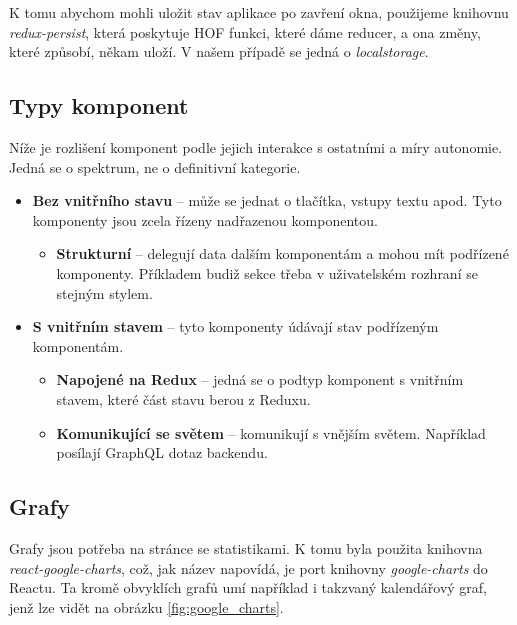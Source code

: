 K tomu abychom mohli uložit stav aplikace po zavření okna, použijeme knihovnu \textit{redux-persist}, která poskytuje
HOF funkci, které dáme reducer, a ona změny, které způsobí, někam uloží. \citep[viz][]{reduxpersist}
V našem případě se jedná o \textit{localstorage}.

\subsection{Typy komponent}

Níže je rozlišení komponent podle jejich interakce s ostatními a míry autonomie.
Jedná se o spektrum, ne o definitivní kategorie.

\begin{itemize}
  \setlength\itemsep{0.05em}
  \item \textbf{Bez vnitřního stavu} -- může se jednat o tlačítka, vstupy textu apod. Tyto komponenty jsou zcela řízeny
      nadřazenou komponentou.
  \begin{itemize}
    \setlength\itemsep{0.05em}
    \item \textbf{Strukturní} -- delegují data dalším komponentám a mohou mít podřízené komponenty. Příkladem budiž sekce třeba v 
        uživatelském rozhraní se stejným stylem.
  \end{itemize}
  \item \textbf{S vnitřním stavem} -- tyto komponenty údávají stav podřízeným komponentám.
  \begin{itemize}
    \setlength\itemsep{0.05em}
    \item \textbf{Napojené na Redux} -- jedná se o podtyp komponent s vnitřním stavem, které část stavu berou z Reduxu.
    \item \textbf{Komunikující se světem} --  komunikují s vnějším světem. Například posílají GraphQL dotaz backendu.
  \end{itemize}
\end{itemize}

\subsection{Grafy}

Grafy jsou potřeba na stránce se statistikami. K tomu byla použita knihovna \textit{react-google-charts},
což, jak název napovídá, je port knihovny \textit{google-charts} do Reactu. Ta kromě obvyklích grafů umí
například i takzvaný kalendářový graf, jenž lze vidět na obrázku \ref{fig:google_charts}.

